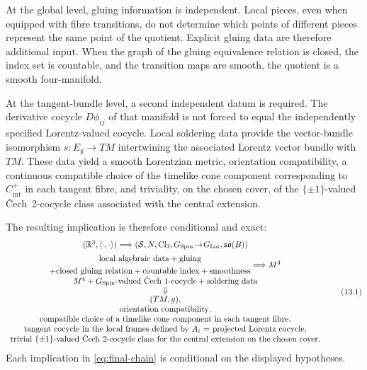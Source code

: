 \documentclass[11pt,a4paper]{article}
\theoremstyle{definition}
\theoremstyle{remark}
\newcommand{\R}{\mathbb{R}}
\newcommand{\Smodel}{\mathcal{S}}
\newcommand{\Cl}{\operatorname{Cl}}
\newcommand{\SpinG}{G_{\mathrm{Spin}}}
\newcommand{\LorG}{G_{\mathrm{Lor}}}
\newcommand{\Cech}{\ifmmode\text{\v{C}ech}\else\v{C}ech\fi}
\newcommand{\soB}{\mathfrak{so}(B)}
\begin{document}
At the global level, gluing information is independent.  Local pieces,
even when equipped with fibre transitions, do not determine which points
of different pieces represent the same point of the quotient.  Explicit gluing data are therefore additional input.  When the graph of the gluing equivalence relation is closed, the index set is countable, and the transition maps are smooth, the quotient is a smooth four-manifold.

At the tangent-bundle level, a second independent datum is required.  The derivative cocycle \(D\phi_{ij}\) of that manifold is not forced to equal the independently specified Lorentz-valued cocycle.  Local soldering data provide the vector-bundle isomorphism \(s:E_g\to TM\) intertwining the associated Lorentz vector bundle with \(TM\).  These data yield a smooth Lorentzian metric, orientation compatibility, a continuous compatible choice of the timelike cone component corresponding to \(C^{+}_{\mathrm{int}}\) in each tangent fibre, and triviality, on the chosen cover, of the \(\{\pm1\}\)-valued \Cech\ 2-cocycle class associated with the central extension.

The resulting implication is therefore conditional and exact:
\[
\begin{array}{c}
(\R^{3},\langle\cdot,\cdot\rangle)
\Longrightarrow
(\Smodel,N,\Cl_{3},\SpinG\!\to\!\LorG,\soB)
\\[0.5em]
\begin{gathered}
\text{local algebraic data}+\text{gluing}\\
+\text{closed gluing relation}+\text{countable index}+\text{smoothness}
\end{gathered}
\Longrightarrow M^{4}
\\[0.5em]
M^{4}+\text{\(G_{\mathrm{Spin}}\)-valued \Cech\ 1-cocycle}+\text{soldering data}
\\[-0.1em]
\Downarrow
\\[-0.1em]
(TM,g),
\\
\text{orientation compatibility},
\\
\text{compatible choice of a timelike cone component in each tangent fibre},
\\
\text{tangent cocycle in the local frames defined by }A_i\text{ = projected Lorentz cocycle},
\\
\text{trivial \(\{\pm1\}\)-valued \Cech\ 2-cocycle class for the central extension on the chosen cover}.
\end{array}
\tag{13.1}\label{eq:final-chain}
\]
Each implication in \eqref{eq:final-chain} is conditional on the displayed
hypotheses.
\end{document}
